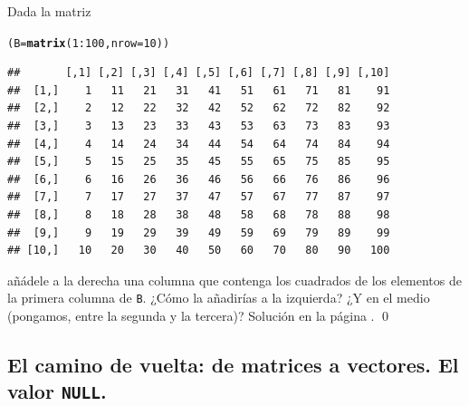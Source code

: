 \documentclass[10pt,a4paper]{article}\usepackage[]{graphicx}\usepackage[]{color}
\makeatletter
\newcommand{\hlnum}[1]{\textcolor[rgb]{0.686,0.059,0.569}{#1}}%
\newcommand{\hlopt}[1]{\textcolor[rgb]{0,0,0}{#1}}%
\newcommand{\hlstd}[1]{\textcolor[rgb]{0.345,0.345,0.345}{#1}}%
\newcommand{\hlkwb}[1]{\textcolor[rgb]{0.69,0.353,0.396}{#1}}%
\newcommand{\hlkwc}[1]{\textcolor[rgb]{0.333,0.667,0.333}{#1}}%
\newcommand{\hlkwd}[1]{\textcolor[rgb]{0.737,0.353,0.396}{\textbf{#1}}}%
\newenvironment{kframe}{%
 \def\at@end@of@kframe{}%
 \ifinner\ifhmode%
  \def\at@end@of@kframe{\end{minipage}}%
  \begin{minipage}{\columnwidth}%
 \fi\fi%
 \def\FrameCommand##1{\hskip\@totalleftmargin \hskip-\fboxsep
 \colorbox{shadecolor}{##1}\hskip-\fboxsep
     \hskip-\linewidth \hskip-\@totalleftmargin \hskip\columnwidth}%
 \MakeFramed {\advance\hsize-\width
   \@totalleftmargin\z@ \linewidth\hsize
   \@setminipage}}%
 {\par\unskip\endMakeFramed%
 \at@end@of@kframe}
\newenvironment{knitrout}{}{} %
\newcounter {cont01}
\makeatother
\begin{document}
     \begin{ejercicio}
\label{tut03:ejercicio09}
\quad
Dada la matriz
\begin{knitrout}
\color{fgcolor}\begin{kframe}
\begin{alltt}
     \hlstd{(B} \hlkwb{=} \hlkwd{matrix}\hlstd{(}\hlnum{1}\hlopt{:}\hlnum{100}\hlstd{,} \hlkwc{nrow}\hlstd{=}\hlnum{10}\hlstd{))}
\end{alltt}
\begin{verbatim}
##       [,1] [,2] [,3] [,4] [,5] [,6] [,7] [,8] [,9] [,10]
##  [1,]    1   11   21   31   41   51   61   71   81    91
##  [2,]    2   12   22   32   42   52   62   72   82    92
##  [3,]    3   13   23   33   43   53   63   73   83    93
##  [4,]    4   14   24   34   44   54   64   74   84    94
##  [5,]    5   15   25   35   45   55   65   75   85    95
##  [6,]    6   16   26   36   46   56   66   76   86    96
##  [7,]    7   17   27   37   47   57   67   77   87    97
##  [8,]    8   18   28   38   48   58   68   78   88    98
##  [9,]    9   19   29   39   49   59   69   79   89    99
## [10,]   10   20   30   40   50   60   70   80   90   100
\end{verbatim}
\end{kframe}
\end{knitrout}
     añádele a la derecha una columna que contenga los cuadrados de los elementos de la primera columna de {\tt B}. ¿Cómo la añadirías a la izquierda? ¿Y en el medio (pongamos, entre la segunda y la tercera)? Solución en la página \pageref{tut03:ejercicio09:sol}.
\qed
\end{ejercicio}

\subsection{El camino de vuelta: de matrices a vectores. El valor {\tt NULL}.}
\label{tut03:subsec:CaminoVueltaMatricesVectores}
\end{document}
